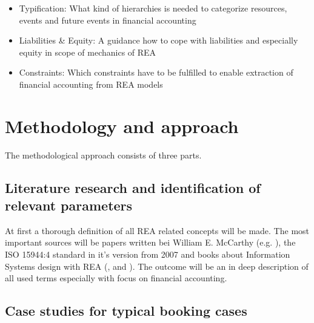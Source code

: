 \begin{itemize}
	\item Typification: What kind of hierarchies is needed to categorize resources, events and future events in financial accounting
	\item Liabilities \& Equity: A guidance how to cope with liabilities and especially equity in scope of mechanics of REA 
	\item Constraints: Which constraints have to be fulfilled to enable extraction of financial accounting from REA models
	
\end{itemize}





\section*{Methodology and approach}

The methodological approach consists of three parts.

\subsection*{Literature research and identification of relevant parameters}

At first a thorough definition of all REA related concepts will be made. The most important sources will be papers written bei William E. McCarthy (e.g. \cite{mccarthy1982rea}), the ISO 15944:4 standard in it's version from 2007 \cite{ISOIEC1594442007} and books about Information Systems design with REA (\cite{dunn2005enterpriseinfosys}, \cite{hruby2006modeldrivendesign} and \cite{hollander2000accounting}). The outcome will be an in deep description of all used terms especially with focus on financial accounting.

\subsection*{ Case studies for typical booking cases}

